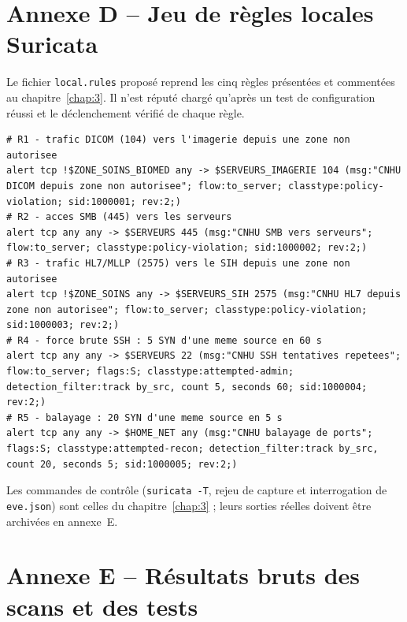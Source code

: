 
\section*{Annexe D -- Jeu de règles locales Suricata}

Le fichier \texttt{local.rules} proposé reprend les cinq règles présentées et commentées au chapitre~\ref{chap:3}. Il n'est réputé chargé qu'après un test de configuration réussi et le déclenchement vérifié de chaque règle.

\begin{lstlisting}[language={},breaklines=true,basicstyle=\ttfamily\scriptsize]
# R1 - trafic DICOM (104) vers l'imagerie depuis une zone non autorisee
alert tcp !$ZONE_SOINS_BIOMED any -> $SERVEURS_IMAGERIE 104 (msg:"CNHU DICOM depuis zone non autorisee"; flow:to_server; classtype:policy-violation; sid:1000001; rev:2;)
# R2 - acces SMB (445) vers les serveurs
alert tcp any any -> $SERVEURS 445 (msg:"CNHU SMB vers serveurs"; flow:to_server; classtype:policy-violation; sid:1000002; rev:2;)
# R3 - trafic HL7/MLLP (2575) vers le SIH depuis une zone non autorisee
alert tcp !$ZONE_SOINS any -> $SERVEURS_SIH 2575 (msg:"CNHU HL7 depuis zone non autorisee"; flow:to_server; classtype:policy-violation; sid:1000003; rev:2;)
# R4 - force brute SSH : 5 SYN d'une meme source en 60 s
alert tcp any any -> $SERVEURS 22 (msg:"CNHU SSH tentatives repetees"; flow:to_server; flags:S; classtype:attempted-admin; detection_filter:track by_src, count 5, seconds 60; sid:1000004; rev:2;)
# R5 - balayage : 20 SYN d'une meme source en 5 s
alert tcp any any -> $HOME_NET any (msg:"CNHU balayage de ports"; flags:S; classtype:attempted-recon; detection_filter:track by_src, count 20, seconds 5; sid:1000005; rev:2;)
\end{lstlisting}

Les commandes de contrôle (\texttt{suricata -T}, rejeu de capture et interrogation de \texttt{eve.json}) sont celles du chapitre~\ref{chap:3} ; leurs sorties réelles doivent être archivées en annexe~E.

\section*{Annexe E -- Résultats bruts des scans et des tests}

